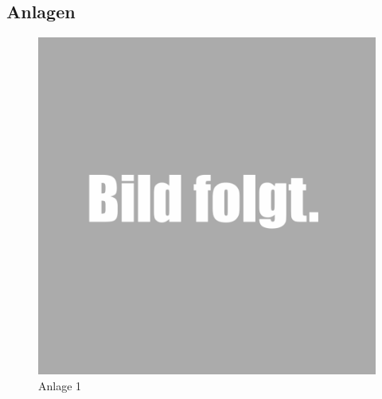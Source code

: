 \documentclass[12pt,a4paper]{scrartcl}
\begin{document}
	\subsection{Anlagen}	

\begin{figure}[h]
 \centering
 \includegraphics[width=13cm]{src/bild1.png}
 \caption{Anlage 1}
 \label{Anlage 1}
\end{figure}

	\newpage
	\lstlistoflistings

\newpage
\end{document}
